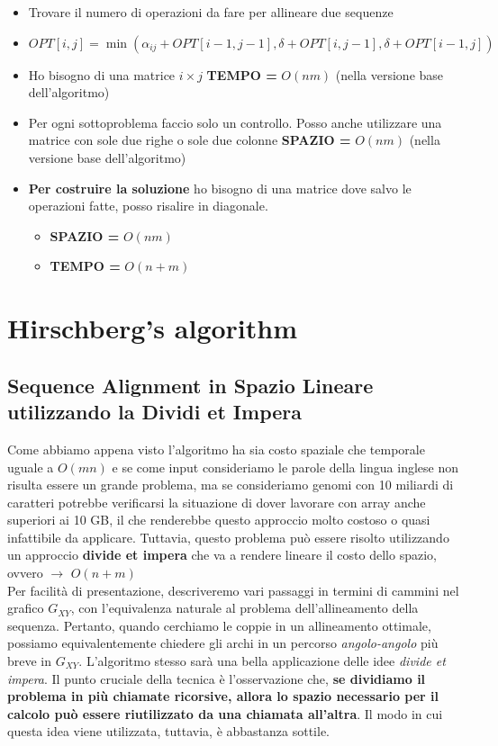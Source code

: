\begin{itemize}
  \item
        Trovare il numero di operazioni da fare per allineare due sequenze
  \item
        $OPT[i,j] = \min (\alpha_{ij} + OPT[i-1,j-1], \delta + OPT[i, j-1], \delta + OPT[i-1, j])$
  \item
        Ho bisogno di una matrice $i \times j$ \textbf{TEMPO =} $O(nm)$
        (nella versione base dell'algoritmo)
  \item
        Per ogni sottoproblema faccio solo un controllo. Posso anche
        utilizzare una matrice con sole due righe o sole due colonne
        \textbf{SPAZIO =} $O(nm)$ (nella versione base dell'algoritmo)
  \item
        \textbf{Per costruire la soluzione} ho bisogno di una matrice dove
        salvo le operazioni fatte, posso risalire in diagonale.

        \begin{itemize}
          \item
                \textbf{SPAZIO =} $O(nm)$
          \item
                \textbf{TEMPO =} $O(n+m)$
        \end{itemize}
\end{itemize}

\section{Hirschberg's algorithm}

\subsection{Sequence Alignment in Spazio Lineare utilizzando la Dividi et Impera}

Come abbiamo appena visto l'algoritmo ha sia costo spaziale che
temporale uguale a $O(mn)$ e se come input consideriamo le parole
della lingua inglese non risulta essere un grande problema, ma se
consideriamo genomi con 10 miliardi di caratteri potrebbe verificarsi la
situazione di dover lavorare con array anche superiori ai 10 GB, il che
renderebbe questo approccio molto costoso o quasi infattibile da
applicare. Tuttavia, questo problema può essere risolto utilizzando un
approccio \textbf{divide et impera} che va a rendere lineare il costo
dello spazio, ovvero $\rightarrow$ $O(n + m)$\\

Per facilità di presentazione, descriveremo vari passaggi in termini di
cammini nel grafico $G_{XY}$, con l'equivalenza naturale al problema
dell'allineamento della sequenza. Pertanto, quando cerchiamo le coppie
in un allineamento ottimale, possiamo equivalentemente chiedere gli
archi in un percorso \emph{angolo-angolo} più breve in $G_{XY}$.
L'algoritmo stesso sarà una bella applicazione delle idee \emph{divide
  et impera}. Il punto cruciale della tecnica è l'osservazione che,
\textbf{se dividiamo il problema in più chiamate ricorsive, allora lo
  spazio necessario per il calcolo può essere riutilizzato da una chiamata
  all'altra}. Il modo in cui questa idea viene utilizzata, tuttavia, è
abbastanza sottile.

